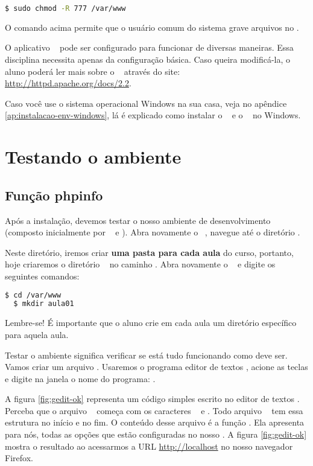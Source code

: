 \begin{lstlisting}[language=bash,style=codigos]
  $ sudo chmod -R 777 /var/www 
\end{lstlisting}

O comando acima permite que o usuário comum do sistema grave arquivos no \dirpadrao.

O aplicativo \apache~ pode ser configurado para funcionar de diversas maneiras. 
Essa disciplina necessita apenas da configuração básica. Caso queira modificá-la, 
o aluno poderá ler mais sobre o \apache~ através do site: \url{http://httpd.apache.org/docs/2.2}.

Caso você use o sistema operacional Windows na sua casa, veja no apêndice 
\ref{ap:instalacao-env-windows}, lá é explicado como instalar o \php~ e o \apache~ no Windows.


\section{Testando o ambiente}
\label{testando-ambiente}

\subsection{Função phpinfo}
\label{subsection:funcao-phpinfo}

Após a instalação, devemos testar o nosso ambiente de desenvolvimento (composto
inicialmente por \php~ e \apache). Abra novamente o \terminal~, navegue até o
diretório \dirpadrao.

Neste diretório, iremos criar \textbf{uma pasta para cada aula} do curso, portanto, hoje
criaremos o diretório ~ no caminho \dirpadrao. Abra novamente o \terminal~
e digite os seguintes comandos:

\begin{lstlisting}[language=bash,style=codigos]
  $ cd /var/www 
  $ mkdir aula01
\end{lstlisting}

Lembre-se! É importante que o aluno crie em cada aula um diretório 
específico para aquela aula.

Testar o ambiente significa verificar se está tudo funcionando como deve ser. Vamos criar um 
arquivo \phpextensao. Usaremos o programa editor de textos \gedit, acione as teclas \altfdois 
e digite na janela o nome do programa: \gedit. 

A figura \ref{fig:gedit-ok} representa um código simples escrito no editor de textos \gedit. 
Perceba que o arquivo \phpextensao~ começa com os caracteres \phpinicio~ e \phpfim. 
Todo arquivo \phpextensao~ tem essa estrutura no início e no fim. O conteúdo desse arquivo é 
a função \funcaophpinfo. Ela apresenta para nós, todas as opções que estão configuradas no 
nosso \php. A figura \ref{fig:gedit-ok} mostra o resultado ao acessarmos a URL \url{http://localhost} 
no nosso navegador Firefox.

